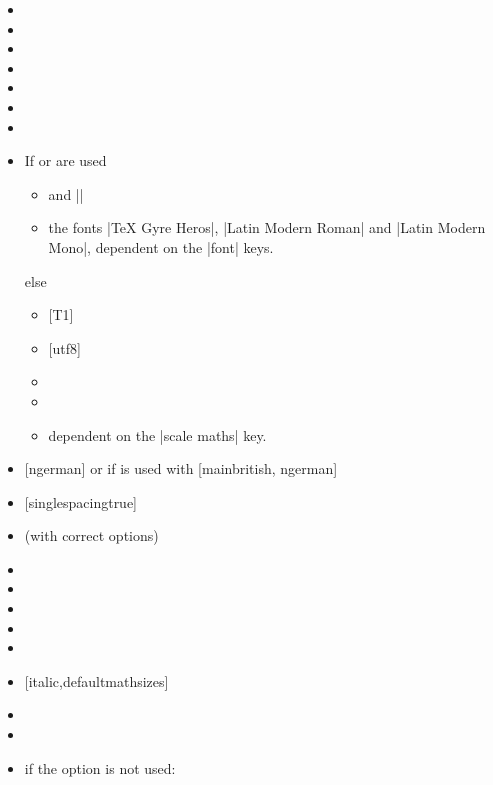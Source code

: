 \begin{multicols}{2}%
  \begin{itemize}[leftmargin=10pt]
    \item {}
    \item {}
    \item {}
    \item {}
    \item {}
    \item {}
    \item {}
    \item If  or  are used
      \begin{itemize}[topsep=0pt]
        \item {} and \bverb||
        \item the fonts \bverb|TeX Gyre Heros|, \bverb|Latin Modern Roman| and
          \bverb|Latin Modern Mono|, dependent on the |font| keys.
      \end{itemize}
      else
      \begin{itemize}[topsep=0pt]
        \item {} [T1]
        \item {} [utf8]
        \item {}
        \item {}
        \item {} dependent on the \bverb|scale maths| key.
      \end{itemize}
    \item {} [ngerman] or if  is used with
      [main\Seq british, ngerman]
    \item {} [singlespacing\Seq true]
    \item {} (with correct options)
    \item {}
    \item {}
    \item {}
    \item {}
    \item {}
    \item {} [italic,defaultmathsizes]
    \item {}
    \item {}
    \item if the  option is not used:

\end{itemize}
\end{multicols}
